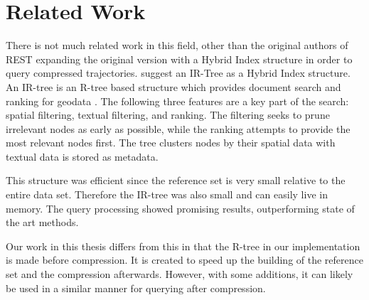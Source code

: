 \chapter{Related Work}
\label{chap:rel}
There is not much related work in this field, other than the original authors of REST expanding the original version with a Hybrid Index structure in order to query compressed trajectories. \textcite{zheng2019reference} suggest an IR-Tree as a Hybrid Index structure. An IR-tree is an R-tree based structure which provides document search and ranking for geodata \cite{li2010ir}. The following three features are a key part of the search: spatial filtering, textual filtering, and ranking. The filtering seeks to prune irrelevant nodes as early as possible, while the ranking attempts to provide the most relevant nodes first. The tree clusters nodes by their spatial data with textual data is stored as metadata.

This structure was efficient since the reference set is very small relative to the entire data set. Therefore the IR-tree was also small and can easily live in memory. The query processing showed promising results, outperforming state of the art methods.

Our work in this thesis differs from this in that the R-tree in our implementation is made before compression. It is created to speed up the building of the reference set and the compression afterwards. However, with some additions, it can likely be used in a similar manner for querying after compression.